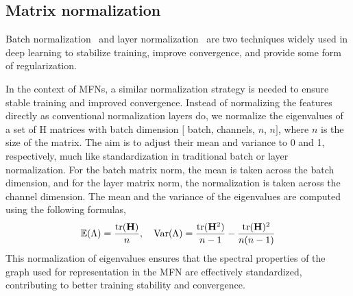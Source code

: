 \documentclass{article} \usepackage{iclr2024_conference,times}
\begin{document}
\vspace{-10pt}
\subsection{Matrix normalization}
\vspace{-5pt}
Batch normalization~\citep{ioffe2015batch} and layer normalization~\citep{ba2016layer} are two techniques widely used in deep learning to stabilize training, improve convergence, and provide some form of regularization.

In the context of MFNs, a similar normalization strategy is needed to ensure stable training and improved convergence. Instead of normalizing the features directly as conventional normalization layers do, we normalize the eigenvalues of a set of H matrices with batch dimension $[$ batch, channels, $n$, $n$$]$, where $n$ is the size of the matrix. The aim is to adjust their mean and variance to 0 and 1, respectively, much like standardization in traditional batch or layer normalization. For the batch matrix norm, the mean is taken across the batch dimension, and for the layer matrix norm, the normalization is taken across the channel dimension.
The mean and the variance of the eigenvalues are computed using the following formulas,
\begin{equation}
    \mathbb{E}(\Lambda) = \frac{\text{tr}({\bf H})}{n}, \quad \text{Var}(\Lambda) = \frac{\text{tr}({\bf H}^2)}{n-1} - \frac{\text{tr}({\bf H})^2}{n(n-1)}
\end{equation}
This normalization of eigenvalues ensures that the spectral properties of the graph used for representation in the MFN are effectively standardized, contributing to better training stability and convergence.
\end{document}
